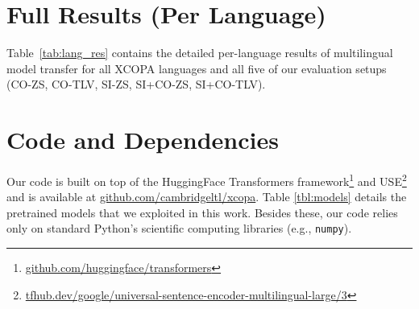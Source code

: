 \documentclass[11pt,a4paper]{article}
\begin{document}
\section{Full Results (Per Language)} 
\label{ss:resultsperlang}
Table~\ref{tab:lang_res} contains the detailed per-language results of multilingual model transfer for all XCOPA languages and all five of our evaluation setups (CO-ZS, CO-TLV, SI-ZS, SI+CO-ZS, SI+CO-TLV).

\section{Code and Dependencies}

Our code is built on top of the HuggingFace Transformers framework\footnote{\url{github.com/huggingface/transformers}} and USE\footnote{\url{tfhub.dev/google/universal-sentence-encoder-multilingual-large/3}} and is available at \url{github.com/cambridgeltl/xcopa}. Table \ref{tbl:models} details the pretrained models that we exploited in this work. Besides these, our code relies only on standard Python's scientific computing libraries (e.g., \texttt{numpy}).




 

 
\end{document}
